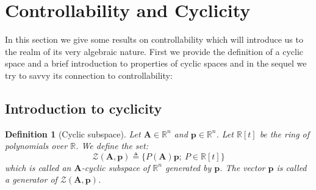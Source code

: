 \documentclass[a4paper,10pt,oneside]{book}
\newtheorem{definition}{Definition}
\begin{document}
\section{Controllability and Cyclicity}
In this section we give some results on controllability which will introduce us to the realm of its very algebraic nature. First we provide the definition of a cyclic space and a brief introduction to properties of cyclic spaces and in the sequel we try to savvy its connection to controllability:

\subsection{Introduction to cyclicity}
\begin{definition}[Cyclic subspace]
 Let $\mathbf{A}\in\mathbb{R}^n$ and $\mathbf{p}\in\mathbb{R}^n$. Let $\mathbb{R}[t]$ be the ring of polynomials over $\mathbb{R}$. We define the set:
 \begin{equation}
  \mathcal{Z}(\mathbf{A},\mathbf{p})\triangleq\{P(\mathbf{A})\mathbf{p};\ P\in\mathbb{R}[t]\}
 \end{equation}
 which is called an $\mathbf{A}$-cyclic subspace of $\mathbb{R}^n$ generated by $\mathbf{p}$. The vector $\mathbf{p}$ is called a generator of $\mathcal{Z}(\mathbf{A},\mathbf{p})$.
\end{definition}
\end{document}
